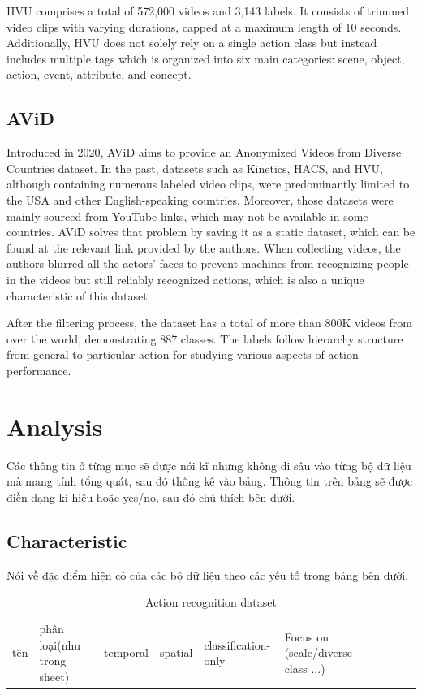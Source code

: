 \documentclass[a4paper]{article}
\begin{document}
HVU comprises a total of 572,000 videos and 3,143 labels. It consists of trimmed video clips with varying durations, capped at a maximum length of 10 seconds. Additionally, HVU does not solely rely on a single action class but instead includes multiple tags which is organized into six main categories: scene, object, action, event, attribute, and concept.
\subsection{AViD}
Introduced in 2020, AViD aims to provide an Anonymized Videos from Diverse Countries dataset. In the past, datasets such as Kinetics, HACS, and HVU, although containing numerous labeled video clips, were predominantly limited to the USA and other English-speaking countries. Moreover, those datasets were mainly sourced from YouTube links, which may not be available in some countries. AViD solves that problem by saving it as a static dataset, which can be found at the relevant link provided by the authors. When collecting videos, the authors blurred all the actors' faces to prevent machines from recognizing people in the videos but still reliably recognized actions, which is also a unique characteristic of this dataset.

After the filtering process, the dataset has a total of more than 800K videos from over the world, demonstrating 887 classes. The labels follow hierarchy structure from general to particular action for studying various aspects of action performance.
\section{Analysis}
Các thông tin ở từng mục sẽ được nói kĩ nhưng không đi sâu vào từng bộ dữ liệu mà mang tính tổng quát, sau đó thống kê vào bảng. Thông tin trên bảng sẽ được điền dạng kí hiệu hoặc yes/no, sau đó chú thích bên dưới.

\subsection{Characteristic}
Nói về đặc điểm hiện có của các bộ dữ liệu theo các yếu tố trong bảng bên dưới.

\begin{table}[h]
	\centering
	\caption{Action recognition dataset}
	\begin{tabular}{l|l l l l l l l l l}
		\toprule
		tên & phân loại(như trong sheet) & temporal & spatial & classification-only & Focus on (scale/diverse class ...) \\
	\end{tabular}%
	\label{config1}
\end{table}%
\end{document}
